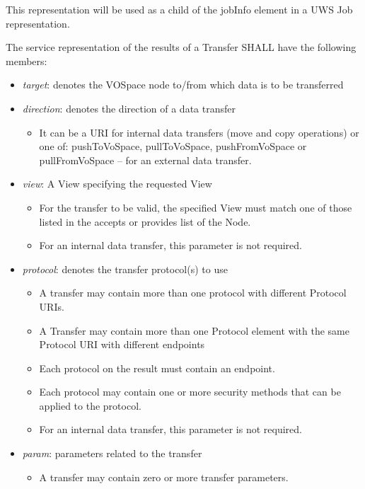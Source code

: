 \documentclass[11pt,a4paper]{ivoa}
\begin{document}
This representation will be used as a child of the jobInfo element in a UWS Job representation.

The service representation of the results of a Transfer SHALL have the following members:

\begin{itemize}
    \item \emph{target}: denotes the VOSpace node to/from which data is to be transferred
    \item \emph{direction}: denotes the direction of a data transfer
        \begin{itemize}
            \item It can be a URI for internal data transfers (move and copy operations) or one of: pushToVoSpace, pullToVoSpace, pushFromVoSpace or pullFromVoSpace -- for an external data transfer.
        \end{itemize}
    \item \emph{view}: A View specifying the requested View
        \begin{itemize}
            \item For the transfer to be valid, the specified View must match one of those listed in the accepts or provides list of the Node.
            \item For an internal data transfer, this parameter is not required.
        \end{itemize}
    \item \emph{protocol}: denotes the transfer protocol(s) to use
        \begin{itemize}
            \item A transfer may contain more than one protocol with different Protocol URIs.
            \item A Transfer may contain more than one Protocol element with the same Protocol URI with different endpoints
            \item Each protocol on the result must contain an endpoint.
            \item Each protocol may contain one or more security methods that can be applied to the protocol.
            \item For an internal data transfer, this parameter is not required.
        \end{itemize}
    \item \emph{param}: parameters related to the transfer
        \begin{itemize}
            \item A transfer may contain zero or more transfer parameters.
        \end{itemize}
\end{itemize}
\end{document}
